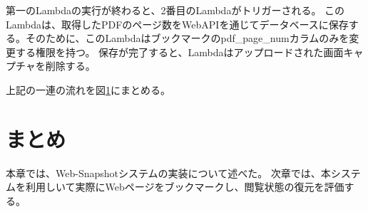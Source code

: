 第一のLambdaの実行が終わると、2番目のLambdaがトリガーされる。
このLambdaは、取得したPDFのページ数をWebAPIを通じてデータベースに保存する。そのために、このLambdaはブックマークのpdf\_page\_numカラムのみを変更する権限を持つ。
保存が完了すると、Lambdaはアップロードされた画面キャプチャを削除する。

上記の一連の流れを図\ref{}にまとめる。

\section{まとめ}
本章では、Web-Snapshotシステムの実装について述べた。
次章では、本システムを利用しいて実際にWebページをブックマークし、閲覧状態の復元を評価する。